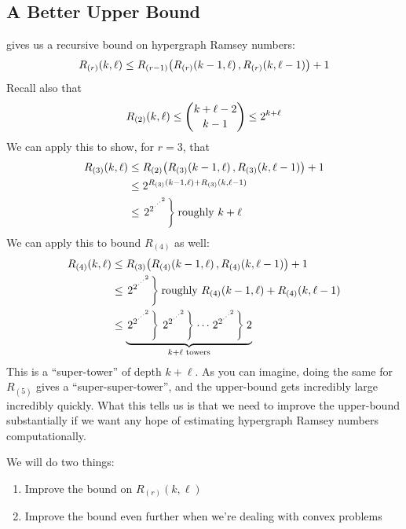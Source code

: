 \subsection{A Better Upper Bound}

 gives us a recursive bound on hypergraph Ramsey numbers:
\begin{align*}
    R_{(r)}\!\left( k, \ell \right) \leq R_{(r - 1)}\!\left( R_{(r)}\!\left( k-1, \ell \right), R_{(r)}\!\left( k, \ell - 1 \right) \right) + 1
\end{align*}
Recall also that
\begin{align*}
    R_{(2)}\!\left( k, \ell \right)
    \leq \binom{k + \ell - 2}{k - 1}
    \leq 2^{k + \ell}
\end{align*}
We can apply this to show, for $r = 3$, that
\begin{align*}
    R_{(3)}\!\left( k, \ell \right)
    & \leq R_{(2)}\!\left( R_{(3)}\!\left( k - 1, \ell \right), R_{(3)}\!\left( k, \ell - 1 \right) \right) + 1 \\
    & \leq 2^{R_{(3)}(k - 1, \ell) + R_{(3)}(k, \ell - 1)} \\
    & \leq \left. 2^{2^{\cdot^{\cdot^{\cdot^{2}}}}} \right\} \text{roughly } k + \ell
\end{align*}
We can apply this to bound $R_{(4)}$ as well:
\begin{align*}
    R_{(4)}\!\left( k, \ell \right)
    & \leq R_{(3)}\!\left( R_{(4)}\!\left( k - 1, \ell \right), R_{(4)}\!\left( k, \ell - 1 \right) \right) + 1 \\
    & \leq \left. 2^{2^{\cdot^{\cdot^{\cdot^{2}}}}} \right\} \text{roughly } R_{(4)}\!\left( k - 1, \ell \right) + R_{(4)}\!\left( k, \ell - 1 \right) \\
    & \leq \underbrace{\left. 2^{2^{\cdot^{\cdot^{\cdot^{2}}}}} \right\} \left. 2^{2^{\cdot^{\cdot^{\cdot^{2}}}}} \right\} \cdots \left. 2^{2^{\cdot^{\cdot^{\cdot^{2}}}}} \right\} 2}_{k + \ell \text{ towers}}
\end{align*}
This is a ``super-tower'' of depth $k + \ell$. As you can imagine, doing the same for $R_{(5)}$ gives a ``super-super-tower'', and the upper-bound gets incredibly large incredibly quickly. What this tells us is that we need to improve the upper-bound substantially if we want any hope of estimating hypergraph Ramsey numbers computationally.

We will do two things:
\begin{enumerate}
    \item Improve the bound on $R_{(r)}(k, \ell)$
    \item Improve the bound even further when we're dealing with convex problems
\end{enumerate}

